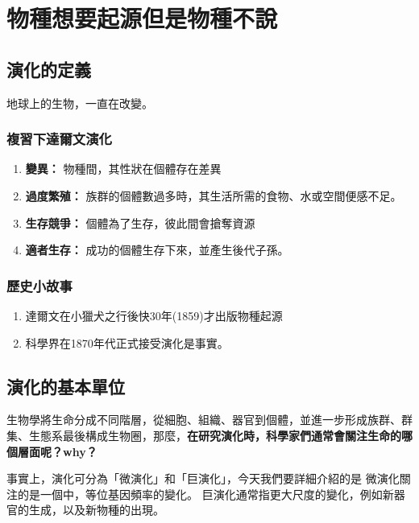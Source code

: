 \chapter{物種想要起源但是物種不說}

\section{演化的定義}
地球上的生物，一直在改變。 \\
\subsection{複習下達爾文演化}
\begin{enumerate}
\item \textbf{變異：}
物種間，其性狀在個體存在差異
\item \textbf{過度繁殖：}
族群的個體數過多時，其生活所需的食物、水或空間便感不足。
\item \textbf{生存競爭：}
個體為了生存，彼此間會搶奪資源
\item \textbf{適者生存：}
成功的個體生存下來，並產生後代子孫。 
\end{enumerate}

\subsection{歷史小故事}
\begin{enumerate}
\item 達爾文在小獵犬之行後快30年(1859)才出版物種起源
\item 科學界在1870年代正式接受演化是事實。
\end{enumerate}

\section{演化的基本單位}
生物學將生命分成不同階層，從細胞、組織、器官到個體，並進一步形成族群、群集、生態系最後構成生物圈，那麼，\textbf{在研究演化時，科學家們通常會關注生命的哪個層面呢？why？}

事實上，演化可分為「微演化」和「巨演化」，今天我們要詳細介紹的是\underline{\hspace{6em}} 
微演化關注的是一個\underline{\hspace{4em}}中，等位基因頻率的變化。
巨演化通常指更大尺度的變化，例如新器官的生成，以及新物種的出現。

